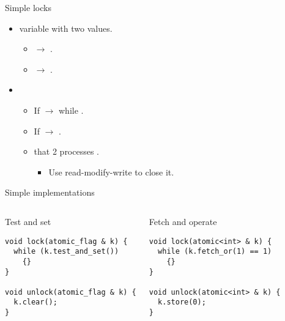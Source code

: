 \begin{frame}[t]{Simple locks}
\begin{itemize}
  \item {} variable  with two values.
    \begin{itemize}
      \item {} $\rightarrow$ .
      \item {} $\rightarrow$ .
    \end{itemize}

  \item {}
    \begin{itemize}
      \item If  $\rightarrow$  while .
      \item If  $\rightarrow$ .
      \item {} that 2 processes .
        \begin{itemize}
          \item Use read-modify-write to close it.
        \end{itemize}
    \end{itemize}
\end{itemize}
\end{frame}

\begin{frame}[t,fragile]{Simple implementations}
\begin{columns}[T]

\begin{block}{Test and set}
\begin{lstlisting}
void lock(atomic_flag & k) {
  while (k.test_and_set())
    {}
}

void unlock(atomic_flag & k) {
  k.clear();
}
\end{lstlisting}
\end{block}

\pause
{}
\begin{block}{Fetch and operate}
\begin{lstlisting}
void lock(atomic<int> & k) {
  while (k.fetch_or(1) == 1)
    {}
}

void unlock(atomic<int> & k) {
  k.store(0);
}
\end{lstlisting}
\end{block}

\end{columns}


\end{frame}


